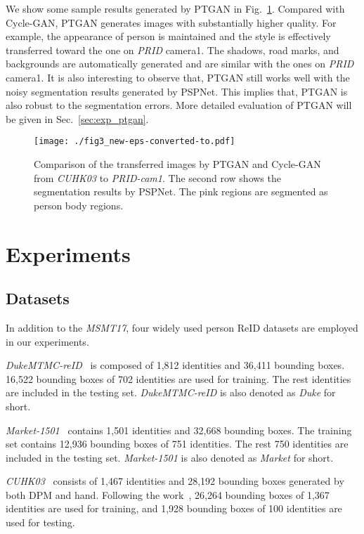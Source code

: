 \documentclass[10pt,twocolumn,letterpaper]{article}
\begin{document}
We show some sample results generated by PTGAN in Fig.~\ref{fig:fig3}. Compared with Cycle-GAN, PTGAN generates images with substantially higher quality. For example, the appearance of person is maintained and the style is effectively transferred toward the one on \emph{PRID} camera1. The shadows, road marks, and backgrounds are automatically generated and are similar with the ones on \emph{PRID} camera1. It is also interesting to observe that, PTGAN still works well with the noisy segmentation results generated by PSPNet. This implies that, PTGAN is also robust to the segmentation errors. More detailed evaluation of PTGAN will be given in Sec.~\ref{sec:exp_ptgan}.

\begin{figure}
\begin{center}
\texttt{[image: ./fig3\_new-eps-converted-to.pdf]}
\end{center}
\caption{Comparison of the transferred images by PTGAN and Cycle-GAN from \emph{CUHK03} to \emph{PRID-cam1}. The second row shows the segmentation results by PSPNet. The pink regions are segmented as person body regions.}
\label{fig:fig3}
\end{figure}

\section{Experiments}

\subsection{Datasets}
In addition to the \emph{MSMT17}, four widely used person ReID datasets are employed in our experiments.

\emph{DukeMTMC-reID}~\cite{zheng2017unlabeled} is composed of 1,812 identities and 36,411 bounding boxes. 16,522 bounding boxes of 702 identities are used for training. The rest identities are included in the testing set. \emph{DukeMTMC-reID} is also denoted as \emph{Duke} for short.

\emph{Market-1501}~\cite{zheng2015scalable} contains 1,501 identities and 32,668 bounding boxes. The training set contains 12,936 bounding boxes of 751 identities. The rest 750 identities are included in the testing set. \emph{Market-1501} is also denoted as \emph{Market} for short.

\emph{CUHK03}~\cite{li2014deepreid} consists of 1,467 identities and 28,192 bounding boxes generated by both DPM and hand. Following the work~\cite{xiao2016learning},  26,264 bounding boxes of 1,367 identities are used for training, and 1,928 bounding boxes of 100 identities are used for testing.
\end{document}
